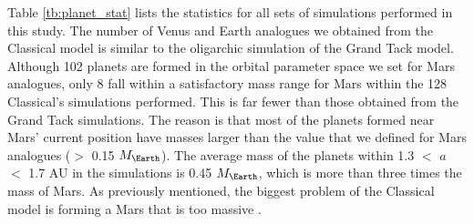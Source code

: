 \documentclass{aa}
\begin{document}
Table \ref{tb:planet_stat} lists the statistics for all sets of simulations performed in this study. The number of Venus and Earth analogues we obtained from the Classical model is similar to the oligarchic simulation of the Grand Tack model. Although 102 planets are formed in the orbital parameter space we set for Mars analogues, only 8 fall within a satisfactory mass range for Mars within the 128 Classical's simulations performed. This is far fewer than those obtained from the Grand Tack simulations. The reason is that most of the planets formed near Mars’ current position have masses larger than the value that we defined for Mars analogues ($>$ 0.15 $M_{\Earth}$). The average mass of the planets within 1.3 $<$ $a$ $<$ 1.7 AU in the simulations is 0.45 $M_{\Earth}$, which is more than three times the mass of Mars. As previously mentioned, the biggest problem of the Classical model is forming a Mars that is too massive \citep[e.g.][]{chambers2001making,raymond2009building}.
\end{document}
